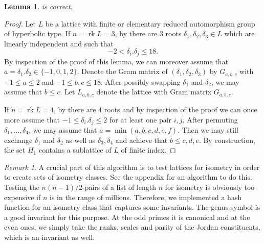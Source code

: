 \documentclass[11pt,letterpaper]{amsart}
\DeclareMathOperator{\rk}{rk}
\newtheorem{lemma}[theorem]{Lemma}
\theoremstyle{definition}
\theoremstyle{remark}
\newtheorem{remark}[theorem]{Remark}
\begin{document}
\begin{lemma}
 is correct.
\end{lemma}
\begin{proof}
Let $L$ be a lattice with finite or elementary reduced automorphism group of hyperbolic type. 
If $n = \rk L =3$, by \cite[Lemma 1]{nikulin.interesting} there are $3$ roots $\delta_1,\delta_2,\delta_3 \in L$ which are linearly independent and such that \[-2 < \delta_i.\delta_j \leq 18.\] 
By inspection of the proof of this lemma, we can moreover assume that $a = \delta_1.\delta_2 \in \{-1,0,1,2\}$. Denote the Gram matrix of $(\delta_1,\delta_2,\delta_3)$ by $G_{a,b,c}$
with $-1 \leq a\leq 2$ and $-1\leq b,c \leq 18$. After possibly swapping $\delta_1$ and $\delta_2$, we may assume that $b \leq c$. Let $L_{a,b,c}$ denote the lattice with Gram matrix $G_{a,b,c}$. 

If $n= \rk L =4$, by \cite[Lemma 1]{nikulin.interesting} there are $4$ roots and by inspection of the proof we can once more assume that $-1 \leq \delta_i.\delta_j \leq 2$ for at least one pair $i,j$. 
After permuting $\delta_1,\dots,\delta_4$, we may assume that $a = \min(a,b,c,d,e,f)$. 
Then we may still exchange $\delta_1$ and $\delta_2$ as well as $\delta_3,\delta_4$ and achieve that 
$b \leq c,d,e$.
By construction, the set $H_1$ contains a sublattice of $L$ of finite index.
\end{proof}

\begin{remark}
A crucial part of this algorithm is to test lattices for isometry in order to create sets of isometry classes. See the appendix for an algorithm to do this. Testing the $n(n-1)/2$-pairs of a list of length $n$ for isometry is obviously too expensive if $n$ is in the range of millions. Therefore, we implemented a hash function for an isometry class that captures some invariants. The genus symbol \cite[Chapter 15]{conway.sloane.lattices} is a good invariant for this purpose. At the odd primes it is canonical and at the even ones, we simply take the ranks, scales and parity of the Jordan constituents, which is an invariant as well.  
\end{remark}
\end{document}

